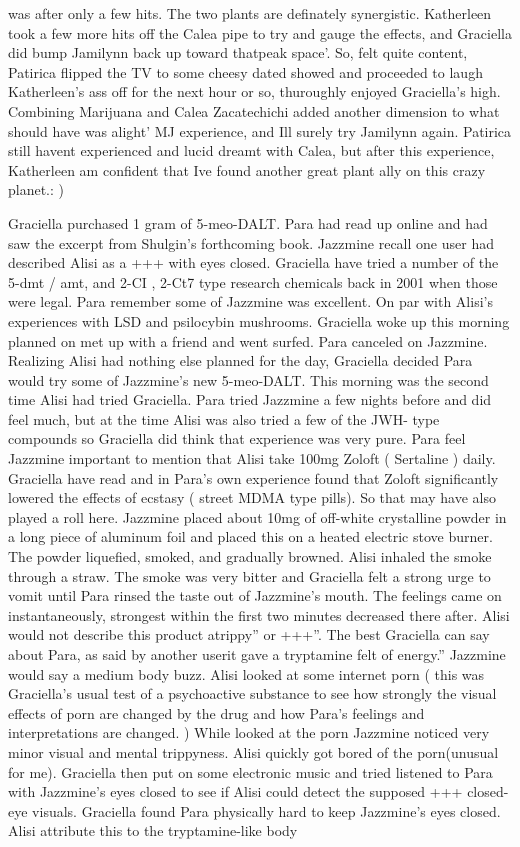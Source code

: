 \documentclass[12pt]{book}
\begin{document}
was after only a few hits. The two plants are definately synergistic. Katherleen took a few more hits off the Calea pipe to try and gauge the effects, and Graciella did bump Jamilynn back up toward thatpeak space'. So, felt quite content, Patirica flipped the TV to some cheesy dated showed and proceeded to laugh Katherleen's ass off for the next hour or so, thuroughly enjoyed Graciella's high. Combining Marijuana and Calea Zacatechichi added another dimension to what should have was alight' MJ experience, and Ill surely try Jamilynn again. Patirica still havent experienced and lucid dreamt with Calea, but after this experience, Katherleen am confident that Ive found another great plant ally on this crazy planet.: )



Graciella purchased 1 gram of 5-meo-DALT. Para had read up online and had saw the excerpt from Shulgin's forthcoming book. Jazzmine recall one user had described Alisi as a +++ with eyes closed. Graciella have tried a number of the 5-dmt / amt, and 2-CI , 2-Ct7 type research chemicals back in 2001 when those were legal. Para remember some of Jazzmine was excellent. On par with Alisi's experiences with LSD and psilocybin mushrooms. Graciella woke up this morning planned on met up with a friend and went surfed. Para canceled on Jazzmine. Realizing Alisi had nothing else planned for the day, Graciella decided Para would try some of Jazzmine's new 5-meo-DALT. This morning was the second time Alisi had tried Graciella. Para tried Jazzmine a few nights before and did feel much, but at the time Alisi was also tried a few of the JWH- type compounds so Graciella did think that experience was very pure. Para feel Jazzmine important to mention that Alisi take 100mg Zoloft ( Sertaline ) daily. Graciella have read and in Para's own experience found that Zoloft significantly lowered the effects of ecstasy ( street MDMA type pills). So that may have also played a roll here. Jazzmine placed about 10mg of off-white crystalline powder in a long piece of aluminum foil and placed this on a heated electric stove burner. The powder liquefied, smoked, and gradually browned. Alisi inhaled the smoke through a straw. The smoke was very bitter and Graciella felt a strong urge to vomit until Para rinsed the taste out of Jazzmine's mouth. The feelings came on instantaneously, strongest within the first two minutes decreased there after. Alisi would not describe this product atrippy'' or +++''. The best Graciella can say about Para, as said by another userit gave a tryptamine felt of energy.'' Jazzmine would say a medium body buzz. Alisi looked at some internet porn ( this was Graciella's usual test of a psychoactive substance to see how strongly the visual effects of porn are changed by the drug and how Para's feelings and interpretations are changed. ) While looked at the porn Jazzmine noticed very minor visual and mental trippyness. Alisi quickly got bored of the porn(unusual for me). Graciella then put on some electronic music and tried listened to Para with Jazzmine's eyes closed to see if Alisi could detect the supposed +++ closed-eye visuals. Graciella found Para physically hard to keep Jazzmine's eyes closed. Alisi attribute this to the tryptamine-like body 
\end{document}

